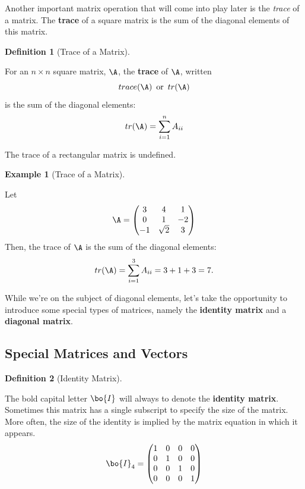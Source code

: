 \documentclass[
]{article}
\theoremstyle{definition}
\newtheorem{definition}{Definition}[section]
\theoremstyle{definition}
\newtheorem{example}{Example}[section]
\theoremstyle{definition}
\theoremstyle{definition}
\theoremstyle{remark}
\begin{document}
Another important matrix operation that will come into play later is the \emph{trace} of a matrix. The \textbf{trace} of a square matrix is the sum of the diagonal elements of this matrix.

\begin{definition}[Trace of a Matrix]
\protect\hypertarget{def:tracedef}{}\label{def:tracedef}

For an \(n\times n\) square matrix, \(\A\), the \textbf{trace} of \(\A\), written
\[trace(\A)\,\,\,\mbox{or}\,\,\,tr(\A)\]
is the sum of the diagonal elements:
\[tr(\A)=\sum_{i=1}^n A_{ii}\]

The trace of a rectangular matrix is undefined.

\end{definition}

\begin{example}[Trace of a Matrix]
\protect\hypertarget{exm:trace}{}\label{exm:trace}

Let \[\A=\left(\begin{matrix} 3&4&1\\0&1&-2\\-1&\sqrt{2}&3\end{matrix}\right)\]
Then, the trace of \(\A\) is the sum of the diagonal elements:
\[tr(\A)=\sum_{i=1}^3 A_{ii} = 3+1+3 = 7.\]

\end{example}

While we're on the subject of diagonal elements, let's take the opportunity to introduce some special types of matrices, namely the \textbf{identity matrix} and a \textbf{diagonal matrix}.

\hypertarget{special}{%
\subsection{Special Matrices and Vectors}\label{special}}

\begin{definition}[Identity Matrix]
\protect\hypertarget{def:identity}{}\label{def:identity}

The bold capital letter \(\bo{I}\) will always to denote the \textbf{identity matrix}. Sometimes this matrix has a single subscript to specify the size of the matrix. More often, the size of the identity is implied by the matrix equation in which it appears.
\[\bo{I}_4 = \left(\begin{matrix} 1 & 0 & 0 & 0 \\
                        0 & 1 & 0 & 0\\
                        0&0&1&0\\
                        0&0&0&1 \end{matrix}\right)\]

\end{definition}
\end{document}
